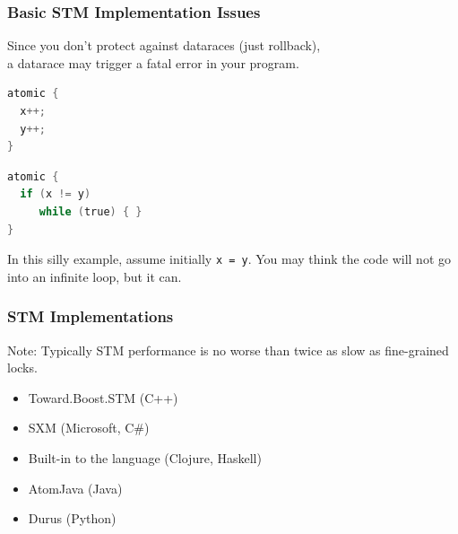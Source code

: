 \begin{frame}[fragile]
  \frametitle{Basic STM Implementation Issues}


    Since you don't protect against dataraces (just rollback),\\
      a datarace may trigger a fatal error in your program.

  \begin{lstlisting}[language=C]
atomic {
  x++;
  y++;
}
  \end{lstlisting}

  \begin{lstlisting}[language=C]
atomic {
  if (x != y)
     while (true) { }
}
  \end{lstlisting}

 In this silly example, assume initially {\tt x = y}. You may think the
      code will not go into an infinite loop, but it can.

\end{frame}

\begin{frame}
  \frametitle{STM Implementations}



  Note: Typically STM performance is no worse than twice as slow as
  fine-grained locks.

  \begin{itemize}
    \item Toward.Boost.STM (C++)

    \item SXM (Microsoft, C\#)

    \item Built-in to the language (Clojure, Haskell)

    \item AtomJava (Java)

    \item Durus (Python)
  \end{itemize}

\end{frame}

